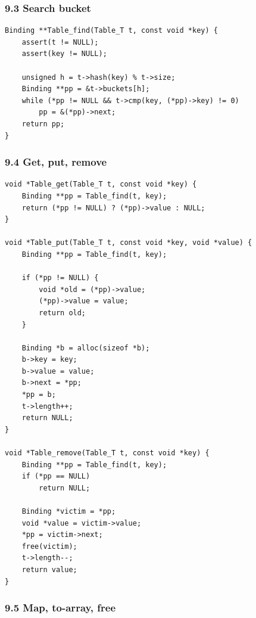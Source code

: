\documentclass[11pt]{article}
\begin{document}
\subsubsection{9.3 Search bucket}\label{search-bucket}

\begin{verbatim}
Binding **Table_find(Table_T t, const void *key) {
    assert(t != NULL);
    assert(key != NULL);

    unsigned h = t->hash(key) % t->size;
    Binding **pp = &t->buckets[h];
    while (*pp != NULL && t->cmp(key, (*pp)->key) != 0)
        pp = &(*pp)->next;
    return pp;
}
\end{verbatim}

\subsubsection{9.4 Get, put, remove}\label{get-put-remove}

\begin{verbatim}
void *Table_get(Table_T t, const void *key) {
    Binding **pp = Table_find(t, key);
    return (*pp != NULL) ? (*pp)->value : NULL;
}

void *Table_put(Table_T t, const void *key, void *value) {
    Binding **pp = Table_find(t, key);

    if (*pp != NULL) {
        void *old = (*pp)->value;
        (*pp)->value = value;
        return old;
    }

    Binding *b = alloc(sizeof *b);
    b->key = key;
    b->value = value;
    b->next = *pp;
    *pp = b;
    t->length++;
    return NULL;
}

void *Table_remove(Table_T t, const void *key) {
    Binding **pp = Table_find(t, key);
    if (*pp == NULL)
        return NULL;

    Binding *victim = *pp;
    void *value = victim->value;
    *pp = victim->next;
    free(victim);
    t->length--;
    return value;
}
\end{verbatim}

\subsubsection{9.5 Map, to-array, free}\label{map-to-array-free}
\end{document}
